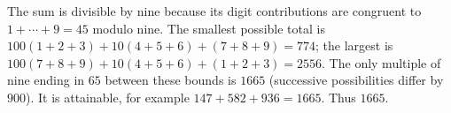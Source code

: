 The sum is divisible by nine because its digit contributions are congruent to $1+\cdots+9=45$ modulo nine. The smallest possible total is $100(1+2+3)+10(4+5+6)+(7+8+9)=774$; the largest is $100(7+8+9)+10(4+5+6)+(1+2+3)=2556$. The only multiple of nine ending in $65$ between these bounds is $1665$ (successive possibilities differ by $900$). It is attainable, for example $147+582+936=1665$. Thus $\boxed{1665}$.
